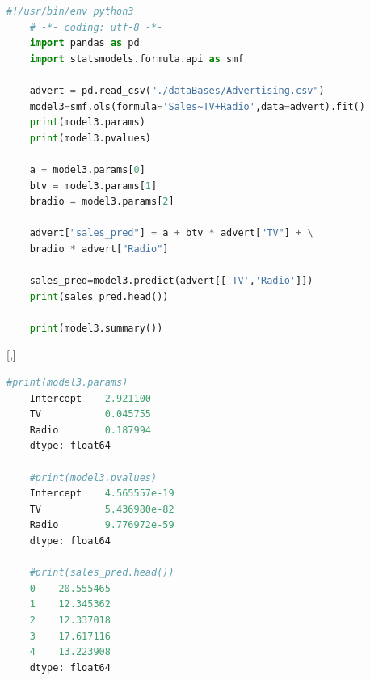 \begin{lstlisting}[language=Python]
	#!/usr/bin/env python3
	# -*- coding: utf-8 -*-
	import pandas as pd
	import statsmodels.formula.api as smf
	
	advert = pd.read_csv("./dataBases/Advertising.csv")
	model3=smf.ols(formula='Sales~TV+Radio',data=advert).fit()
	print(model3.params)
	print(model3.pvalues)
	
	a = model3.params[0]
	btv = model3.params[1]
	bradio = model3.params[2]
	
	advert["sales_pred"] = a + btv * advert["TV"] + \
	bradio * advert["Radio"]
	
	sales_pred=model3.predict(advert[['TV','Radio']])
	print(sales_pred.head())
	
	print(model3.summary())
\end{lstlisting}


[,]{}
\begin{lstlisting}[language=Python]
	#print(model3.params)
	Intercept    2.921100
	TV           0.045755
	Radio        0.187994
	dtype: float64
	
	#print(model3.pvalues)
	Intercept    4.565557e-19
	TV           5.436980e-82
	Radio        9.776972e-59
	dtype: float64
	
	#print(sales_pred.head())
	0    20.555465
	1    12.345362
	2    12.337018
	3    17.617116
	4    13.223908
	dtype: float64
\end{lstlisting}

